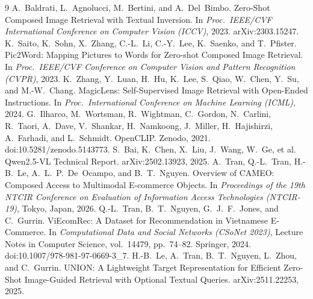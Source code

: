 \documentclass[sigconf,nonacm]{acmart}
\begin{document}
\balance
\begin{thebibliography}{9}
 A.~Baldrati, L.~Agnolucci, M.~Bertini, and A.~Del~Bimbo.
Zero-Shot Composed Image Retrieval with Textual Inversion. In
\emph{Proc.\ IEEE/CVF International Conference on Computer Vision (ICCV)},
2023. arXiv:2303.15247.
 K.~Saito, K.~Sohn, X.~Zhang, C.-L.~Li, C.-Y.~Lee,
K.~Saenko, and T.~Pfister. Pic2Word: Mapping Pictures to Words for Zero-shot
Composed Image Retrieval. In \emph{Proc.\ IEEE/CVF Conference on Computer
Vision and Pattern Recognition (CVPR)}, 2023.
 K.~Zhang, Y.~Luan, H.~Hu, K.~Lee, S.~Qiao, W.~Chen,
Y.~Su, and M.-W.~Chang. MagicLens: Self-Supervised Image Retrieval with
Open-Ended Instructions. In \emph{Proc.\ International Conference on Machine
Learning (ICML)}, 2024.
 G.~Ilharco, M.~Wortsman, R.~Wightman, C.~Gordon,
N.~Carlini, R.~Taori, A.~Dave, V.~Shankar, H.~Namkoong, J.~Miller,
H.~Hajishirzi, A.~Farhadi, and L.~Schmidt. OpenCLIP. Zenodo, 2021.
doi:10.5281/zenodo.5143773.
 S.~Bai, K.~Chen, X.~Liu, J.~Wang, W.~Ge, et al.
Qwen2.5-VL Technical Report. arXiv:2502.13923, 2025.
 A.~Tran, Q.-L.~Tran, H.-B.~Le, A.~L.~P.~De~Ocampo, and
B.~T.~Nguyen. Overview of CAMEO: Composed Access to Multimodal
E-commerce Objects. In \emph{Proceedings of the 19th NTCIR Conference on
Evaluation of Information Access Technologies (NTCIR-19)}, Tokyo, Japan,
2026.
 Q.-L.~Tran, B.~T.~Nguyen, G.~J.~F.~Jones, and C.~Gurrin.
ViEcomRec: A Dataset for Recommendation in Vietnamese E-Commerce. In
\emph{Computational Data and Social Networks (CSoNet 2023)}, Lecture Notes in
Computer Science, vol.\ 14479, pp.\ 74--82. Springer, 2024.
doi:10.1007/978-981-97-0669-3\_7.
 H.-B.~Le, A.~Tran, B.~T.~Nguyen, L.~Zhou, and C.~Gurrin.
UNION: A Lightweight Target Representation for Efficient Zero-Shot
Image-Guided Retrieval with Optional Textual Queries. arXiv:2511.22253, 2025.
\end{thebibliography}
\end{document}

